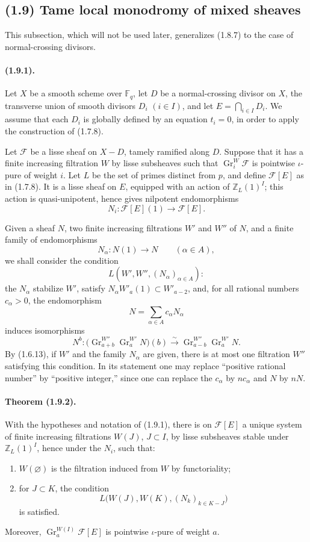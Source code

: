 \documentclass[11pt]{article}
\theoremstyle{remark}
\newcommand{\ZZ}{\mathbb{Z}}
\newcommand{\Fq}{\mathbb{F}_q}
\newcommand{\Gr}{\operatorname{Gr}}
\begin{document}
\subsection*{(1.9) Tame local monodromy of mixed sheaves}

This subsection, which will not be used later, generalizes (1.8.7) to the case of normal-crossing divisors.

\paragraph{(1.9.1).}
Let \(X\) be a smooth scheme over \(\Fq\), let \(D\) be a normal-crossing divisor on \(X\), the transverse union of smooth divisors \(D_i\) \((i\in I)\), and let \(E=\bigcap_{i\in I}D_i\). We assume that each \(D_i\) is globally defined by an equation \(t_i=0\), in order to apply the construction of (1.7.8).

Let \(\mathcal F\) be a lisse sheaf on \(X-D\), tamely ramified along \(D\). Suppose that it has a finite increasing filtration \(W\) by lisse subsheaves such that \(\Gr^W_i\mathcal F\) is pointwise \(\iota\)-pure of weight \(i\). Let \(L\) be the set of primes distinct from \(p\), and define \(\mathcal F[E]\) as in (1.7.8). It is a lisse sheaf on \(E\), equipped with an action of \(\ZZ_L(1)^I\); this action is quasi-unipotent, hence gives nilpotent endomorphisms
\[
N_i:\mathcal F[E](1)\longrightarrow \mathcal F[E].
\]

Given a sheaf \(N\), two finite increasing filtrations \(W'\) and \(W''\) of \(N\), and a finite family of endomorphisms
\[
N_\alpha:N(1)\longrightarrow N \qquad (\alpha\in A),
\]
we shall consider the condition
\[
L(W',W'',(N_\alpha)_{\alpha\in A}):
\]
the \(N_\alpha\) stabilize \(W'\), satisfy \(N_\alpha W'_a(1)\subset W'_{a-2}\), and, for all rational numbers \(c_\alpha>0\), the endomorphism
\[
N=\sum_{\alpha\in A}c_\alpha N_\alpha
\]
induces isomorphisms
\[
N^b:\bigl(\Gr^{W''}_{a+b}\Gr^{W'}_a N\bigr)(b)
   \xrightarrow{\sim}
   \Gr^{W''}_{a-b}\Gr^{W'}_a N .
\]
By (1.6.13), if \(W'\) and the family \(N_\alpha\) are given, there is at most one filtration \(W''\) satisfying this condition. In its statement one may replace ``positive rational number'' by ``positive integer,'' since one can replace the \(c_\alpha\) by \(n c_\alpha\) and \(N\) by \(nN\).

\paragraph{Theorem (1.9.2).}
With the hypotheses and notation of (1.9.1), there is on \(\mathcal F[E]\) a unique system of finite increasing filtrations \(W(J)\), \(J\subset I\), by lisse subsheaves stable under \(\ZZ_L(1)^I\), hence under the \(N_i\), such that:
\begin{enumerate}[label=\alph*)]
\item \(W(\varnothing)\) is the filtration induced from \(W\) by functoriality;
\item for \(J\subset K\), the condition
\[
L\bigl(W(J),W(K),(N_k)_{k\in K-J}\bigr)
\]
is satisfied.
\end{enumerate}
Moreover, \(\Gr^{W(I)}_a\mathcal F[E]\) is pointwise \(\iota\)-pure of weight \(a\).
\end{document}
